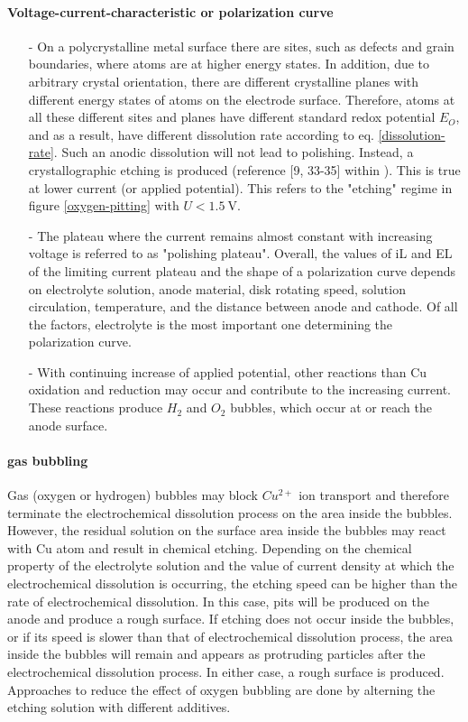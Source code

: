 \paragraph{Voltage-current-characteristic or polarization curve}
\begin{itemize}
 \item[-]On a polycrystalline metal surface there are sites, such as defects and grain boundaries, where atoms are at higher energy states. In addition, due to arbitrary crystal orientation, there are different crystalline planes with different energy states of atoms on the electrode surface. Therefore, atoms at all these different sites and planes have different standard redox potential $E_O$, and as a result, have different dissolution rate according to eq. \ref{dissolution-rate}. Such an anodic dissolution will not lead to polishing. Instead, a crystallographic etching is produced (reference [9, 33-35] within \cite{jinshan_electrochemical_2004}). This is true at lower current (or applied potential). This refers to the "etching" regime in figure \ref{oxygen-pitting} with $U<\SI{1.5}{\volt}$.
 \item[-]The plateau where the current remains almost constant with increasing voltage is referred to as "polishing plateau". Overall, the values of iL and EL of the limiting current plateau and the shape of a polarization curve depends on electrolyte solution, anode material, disk rotating speed, solution circulation, temperature, and the distance between anode and cathode.
Of all the factors, electrolyte is the most important one determining the polarization curve.
 \item[-]With continuing increase of applied potential, other reactions than Cu oxidation and reduction may occur and contribute to the increasing current. These reactions produce $H_2$ and $O_2$ bubbles, which occur at or reach the anode surface.
\end{itemize}

\paragraph{gas bubbling}
Gas (oxygen or hydrogen) bubbles may block $Cu^{2+}$ ion transport and therefore terminate the electrochemical dissolution process on the area inside the bubbles. However, the residual solution on the surface area inside the bubbles may react with Cu atom and result in chemical etching. Depending on the chemical property of the electrolyte solution and the value of current density at which the electrochemical dissolution is occurring, the etching speed can be higher than the rate of electrochemical dissolution. In this case, pits will be produced on the anode and produce a rough surface. If etching does not occur inside the bubbles, or if its speed is slower than that of electrochemical dissolution process, the area inside the bubbles will remain and appears as protruding particles after the electrochemical dissolution process. In either case, a rough surface is produced. Approaches to reduce the effect of oxygen bubbling are done by alterning the etching solution with different additives.

